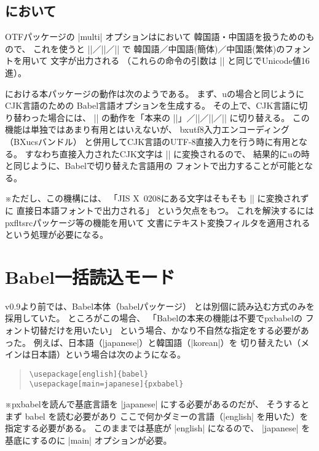 \documentclass[a4paper,uplatex]{jsarticle}
\newcommand{\Pkg}[1]{\textsf{#1}}
\newcommand{\Note}{\par\noindent ※}
\providecommand{\upLaTeX}{u\pLaTeX}
\begin{document}
\subsection{{\pLaTeX}において}

OTFパッケージの |multi| オプションは{\pLaTeX}において
韓国語・中国語を扱うためのもので、
これを使うと |\UTFK|／|\UTFC|／|\UTFT| で
韓国語／中国語(簡体)／中国語(繁体)のフォントを用いて
文字が出力される
（これらの命令の引数は |\UTF| と同じでUnicode値16進）。

{\pLaTeX}における本パッケージの動作は次のようである。
まず、{\upLaTeX}の場合と同じようにCJK言語のための
Babel言語オプションを生成する。
その上で、CJK言語に切り替わった場合には、
|\UTF| の動作を「本来の |\UTF|」／|\UTFK|／|\UTFC|／|\UTFT|
に切り替える。
この機能は単独ではあまり有用とはいえないが、
\Pkg{bxutf8}入力エンコーディング（\Pkg{BXucs}バンドル）
と併用してCJK言語のUTF-8直接入力を行う時に有用となる。
すなわち直接入力されたCJK文字は |\UTF| に変換されるので、
結果的に{\upLaTeX}の時と同じように、Babelで切り替えた言語用の
フォントで出力することが可能となる。

\Note ただし、この機構には、
「JIS X~0208にある文字はそもそも |\UTF| に変換されずに
直接日本語フォントで出力される」
という欠点をもつ。
これを解決するには\Pkg{pxfltsrc}パッケージ等の機能を用いて
文書にテキスト変換フィルタを適用されるという処理が必要になる。

\section{Babel一括読込モード}

v0.9より前では、Babel本体（\Pkg{babel}パッケージ）
とは別個に読み込む方式のみを採用していた。
ところがこの場合、
「Babelの本来の機能は不要で\Pkg{pxbabel}の
フォント切替だけを用いたい」
という場合、かなり不自然な指定をする必要があった。
例えば、日本語（|japanese|）と韓国語（|korean|）を
切り替えたい（メインは日本語）という場合は次のようになる。

\begin{quote}\begin{verbatim}
\usepackage[english]{babel}
\usepackage[main=japanese]{pxbabel}
\end{verbatim}\end{quote}
\Note \Pkg{pxbabel}を読んで基底言語を |japanese|
にする必要があるのだが、
そうするとまず \Pkg{babel} を読む必要があり
ここで何かダミーの言語（|english| を用いた）を指定する必要がある。
このままでは基底が |english| になるので、
|japanese| を基底にするのに |main| オプションが必要。
\end{document}
